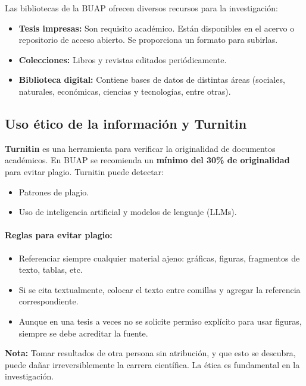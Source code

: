 \documentclass{article}
\begin{document}
Las bibliotecas de la BUAP ofrecen diversos recursos para la investigación:

\begin{itemize}
	\item \textbf{Tesis impresas:} Son requisito académico. Están disponibles en el acervo o repositorio de acceso abierto. Se proporciona un formato para subirlas.
	\item \textbf{Colecciones:} Libros y revistas editados periódicamente.
	\item \textbf{Biblioteca digital:} Contiene bases de datos de distintas áreas (sociales, naturales, económicas, ciencias y tecnologías, entre otras).
\end{itemize}

\subsection{Uso ético de la información y Turnitin} \vspace{0.5cm}

\textcolor{Cerulean}{\textbf{Turnitin}} es una herramienta para verificar la originalidad de documentos académicos.  
En BUAP se recomienda un \textbf{mínimo del 30\% de originalidad} para evitar plagio. Turnitin puede detectar:
\begin{itemize}
	\item Patrones de plagio.
	\item Uso de inteligencia artificial y modelos de lenguaje (LLMs).
\end{itemize}

\paragraph{Reglas para evitar plagio:}
\begin{itemize}
	\item Referenciar siempre cualquier material ajeno: gráficas, figuras, fragmentos de texto, tablas, etc.
	\item Si se cita textualmente, colocar el texto entre comillas y agregar la referencia correspondiente.
	\item Aunque en una tesis a veces no se solicite permiso explícito para usar figuras, siempre se debe acreditar la fuente.
\end{itemize}

\textbf{Nota:} Tomar resultados de otra persona sin atribución, y que esto se descubra, puede dañar irreversiblemente la carrera científica. La ética es fundamental en la investigación.
\end{document}
